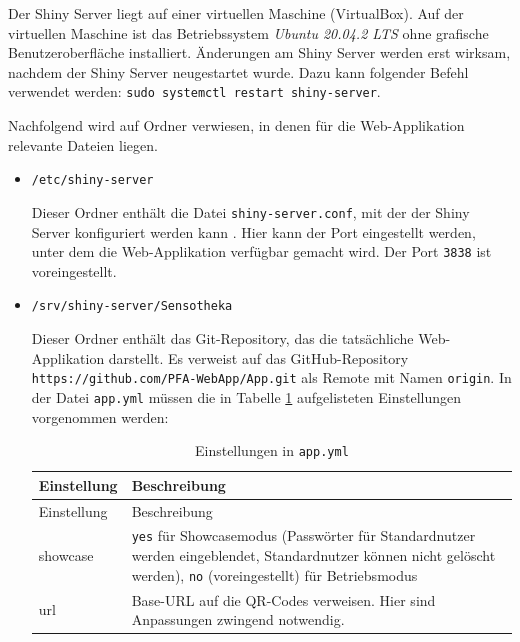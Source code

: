 \documentclass[
]{article}
\begin{document}
Der Shiny Server liegt auf einer virtuellen Maschine (VirtualBox). Auf der virtuellen Maschine ist das Betriebssystem \emph{Ubuntu 20.04.2 LTS} ohne grafische Benutzeroberfläche installiert. Änderungen am Shiny Server werden erst wirksam, nachdem der Shiny Server neugestartet wurde. Dazu kann folgender Befehl verwendet werden: \texttt{sudo\ systemctl\ restart\ shiny-server}.

Nachfolgend wird auf Ordner verwiesen, in denen für die Web-Applikation relevante Dateien liegen.

\begin{itemize}
\item
  \texttt{/etc/shiny-server}

  Dieser Ordner enthält die Datei \texttt{shiny-server.conf}, mit der der Shiny Server konfiguriert werden kann \autocite{shiny-server}. Hier kann der Port eingestellt werden, unter dem die Web-Applikation verfügbar gemacht wird. Der Port \texttt{3838} ist voreingestellt.
\end{itemize}

\begin{itemize}
\item
  \texttt{/srv/shiny-server/Sensotheka}

  Dieser Ordner enthält das Git-Repository, das die tatsächliche Web-Applikation darstellt. Es verweist auf das GitHub-Repository \texttt{https://github.com/PFA-WebApp/App.git} als Remote mit Namen \texttt{origin}. In der Datei \texttt{app.yml} müssen die in Tabelle \ref{tab:app-yml} aufgelisteten Einstellungen vorgenommen werden:

  \begin{longtable}[]{@{}
    >{\raggedright\arraybackslash}p{}
    >{\raggedright\arraybackslash}p{}@{}}
  \caption{\label{tab:app-yml} Einstellungen in \texttt{app.yml}}\tabularnewline
  \toprule
  Einstellung & Beschreibung \\
  \midrule
  \endfirsthead
  \toprule
  Einstellung & Beschreibung \\
  \midrule
  \endhead
  showcase & \texttt{yes} für Showcasemodus (Passwörter für Standardnutzer werden eingeblendet, Standardnutzer können nicht gelöscht werden), \texttt{no} (voreingestellt) für Betriebsmodus \\
  url & Base-URL auf die QR-Codes verweisen. Hier sind Anpassungen zwingend notwendig. \\
  \bottomrule
  \end{longtable}
\end{itemize}
\end{document}
